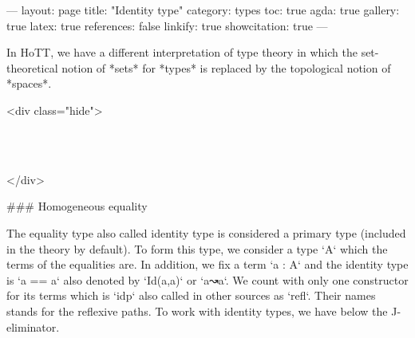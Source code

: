 ---
layout: page
title: "Identity type"
category: types
toc: true
agda: true
gallery: true
latex: true
references: false
linkify: true
showcitation: true
---

In HoTT, we have a different interpretation of type theory in which the
set-theoretical notion of *sets* for *types* is replaced by the topological
notion of *spaces*.

<div class="hide">
\begin{code}%
\>[0]\AgdaSymbol{\{-\#}\AgdaSpace{}%
\AgdaSpace{}%
\AgdaSpace{}%
\AgdaSymbol{\#-\}}\<%
\\
\>[0]\AgdaSpace{}%
\AgdaSpace{}%
%
\>[27]\<%
\\
\>[0]\AgdaSpace{}%
\AgdaSpace{}%
\AgdaSpace{}%
\<%
\end{code}
</div>

### Homogeneous equality

The equality type also called identity type is considered a primary type
(included in the theory by default). To form this type, we consider a type `A`
which the terms of the equalities are. In addition, we fix a term `a : A` and
the identity type is `a == a` also denoted by `Id(a,a)` or `a↝a`. We count with
only one constructor for its terms which is `idp` also called in other sources
as `refl`. Their names stands for the reflexive paths. To work with identity
types, we have below the J-eliminator.

\begin{code}%
\>[0]\<%
\\
\>[0][@{}l@{\AgdaIndent{0}}]%
\>[2]\AgdaOperator{\AgdaDatatype{\AgdaUnderscore{}==\AgdaUnderscore{}}}\AgdaSpace{}%
\AgdaSymbol{\{}\AgdaSpace{}%
\AgdaSymbol{:}\AgdaSpace{}%
\AgdaSpace{}%
\AgdaSymbol{\}}\AgdaSpace{}%
\AgdaSymbol{(}\AgdaSpace{}%
\AgdaSymbol{:}\AgdaSpace{}%
\AgdaSymbol{)}\<%
\\
\>[2][@{}l@{\AgdaIndent{0}}]%
\>[4]\AgdaSymbol{:}\AgdaSpace{}%
\AgdaSpace{}%
\AgdaSpace{}%
\AgdaSpace{}%
\<%
\\
%
\>[2]\<%
\\
%
\>[2]\AgdaSpace{}%
\AgdaSymbol{:}\AgdaSpace{}%
\AgdaSpace{}%
\AgdaOperator{\AgdaDatatype{==}}\AgdaSpace{}%
\<%
\end{code}

